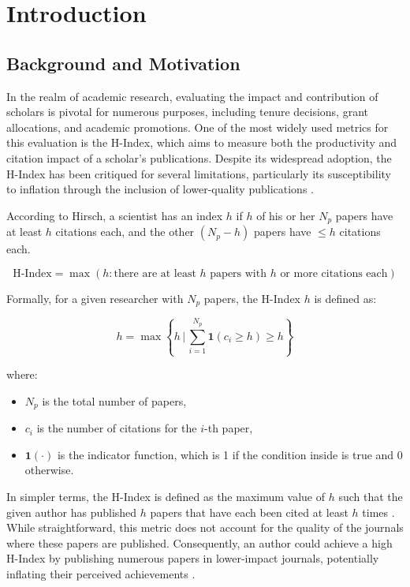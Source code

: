 \chapter{Introduction}
\label{ch:intro}

\section{Background and Motivation}
In the realm of academic research, evaluating the impact and contribution of
scholars is pivotal for numerous purposes, including tenure decisions, grant
allocations, and academic promotions. One of the most widely used metrics for
this evaluation is the H-Index, which aims to measure both the productivity and
citation impact of a scholar’s publications. Despite its widespread adoption,
the H-Index has been critiqued for several limitations, particularly its
susceptibility to inflation through the inclusion of lower-quality publications
\cite{costas2007h, tonta2020monetary}.

According to Hirsch, a scientist has an index \( h \) if \( h \) of his or her
\( N_p \) papers have at least \( h \) citations each, and the other \( (N_p -
h) \) papers have \(\leq h \) citations each.

\[
      \text{H-Index} = \max \left( h : \text{there are at least } h \text{ papers with } h \text{ or more citations each} \right)
\]

Formally, for a given researcher with \( N_p \) papers, the H-Index \( h \) is
defined as:

\[
      h = \max \left\{ h \, \Bigg| \, \sum_{i=1}^{N_p} \mathbf{1} (c_i \geq h) \geq h \right\}
\]

where:
\begin{itemize}
      \item \( N_p \) is the total number of papers,
      \item \( c_i \) is the number of citations for the \( i \)-th paper,
      \item \( \mathbf{1}(\cdot) \) is the indicator function, which is 1 if the condition inside is true and 0 otherwise.
\end{itemize} In simpler terms, the H-Index is defined as the maximum value of $h$
such that the given author has published $h$ papers that have each been cited at least $h$ times \cite{hirsch2005index}.
While straightforward, this metric does not account for the quality of the journals where
these papers are published. Consequently, an author could achieve a high H-Index
by publishing numerous papers in lower-impact journals, potentially inflating their perceived achievements \cite{tonta2020monetary}.

